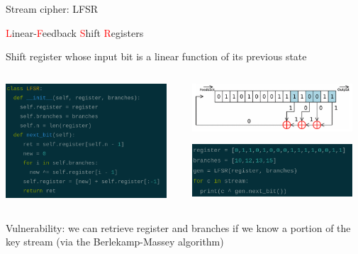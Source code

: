 \begin{frame}{Stream cipher: LFSR}

  \textcolor{red}{L}inear-\textcolor{red}{F}eedback \textcolor{red}{S}hift \textcolor{red}{R}egisters
  
  \medskip

  Shift register whose input bit is a linear function of its previous state
   
  \medskip
  
  \begin{columns}
  \begin{column}{0.5\textwidth}
    \centerline{\includegraphics[width=6cm]{img/LFSR-code.png}}
  \end{column}
  \begin{column}{0.5\textwidth}
    \centerline{\includegraphics[width=6cm]{img/lfsr.png}}

    \medskip

    \centerline{\includegraphics[width=6cm]{img/LFSR-gen.png}}
  \end{column}
  \end{columns}

  \medskip
  
  Vulnerability: we can retrieve register and branches if we know a portion of the key stream (via the Berlekamp-Massey algorithm)
  
\end{frame}
